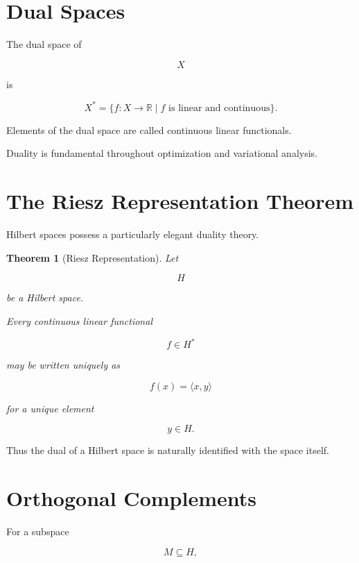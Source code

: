 \documentclass[11pt,fleqn]{book}
\numberwithin{equation}{chapter}
\theoremstyle{plain}
\newtheorem{theorem}{Theorem}[chapter]
\theoremstyle{definition}
\theoremstyle{remark}
\begin{document}

\section{Dual Spaces}

The dual space of

\[
X
\]

is

\[
\boxed{
X^*
=
\{
f:X\rightarrow\mathbb R
\mid
f
\text{ is linear and continuous}
\}.
}
\]

Elements of the dual space are called continuous linear functionals.

Duality is fundamental throughout optimization and variational analysis.


\section{The Riesz Representation Theorem}

Hilbert spaces possess a particularly elegant duality theory.

\begin{theorem}[Riesz Representation]

Let

\[
H
\]

be a Hilbert space.

Every continuous linear functional

\[
f\in H^*
\]

may be written uniquely as

\[
\boxed{
f(x)
=
\langle x,y\rangle
}
\]

for a unique element

\[
y\in H.
\]

\end{theorem}

Thus the dual of a Hilbert space is naturally identified with the space
itself.


\section{Orthogonal Complements}

For a subspace

\[
M
\subseteq
H,
\]
\end{document}

